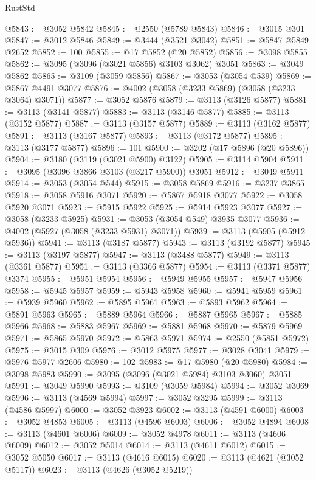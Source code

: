 \begin{lexlean}{RustStd}
\begin{coremodule}
@5843 := @3052 @5842
@5845 := @2550 (@5789 @5843)
@5846 := @3015 @301
@5847 := @3012 @5846
@5849 := @3444 (@3521 @3042)
@5851 := @5847 @5849 @2652
@5852 := 100
@5855 := @17 @5852 (@20 @5852)
@5856 := @3098 @5855
@5862 := @3095 (@3096 (@3021 @5856) @3103 @3062) @3051
@5863 := @3049 @5862
@5865 := @3109 (@3059 @5856)
@5867 := @3053 (@3054 @539)
@5869 := @5867 @4491 @3077
@5876 := @4002 (@3058 (@3233 @5869) (@3058 (@3233 @3064) @3071))
@5877 := @3052 @5876
@5879 := @3113 (@3126 @5877)
@5881 := @3113 (@3141 @5877)
@5883 := @3113 (@3146 @5877)
@5885 := @3113 (@3152 @5877)
@5887 := @3113 (@3157 @5877)
@5889 := @3113 (@3162 @5877)
@5891 := @3113 (@3167 @5877)
@5893 := @3113 (@3172 @5877)
@5895 := @3113 (@3177 @5877)
@5896 := 101
@5900 := @3202 (@17 @5896 (@20 @5896))
@5904 := @3180 (@3119 (@3021 @5900) @3122)
@5905 := @3114 @5904
@5911 := @3095 (@3096 @3866 @3103 (@3217 @5900)) @3051
@5912 := @3049 @5911
@5914 := @3053 (@3054 @544)
@5915 := @3058 @5869
@5916 := @3237 @3865
@5918 := @3058 @5916 @3071
@5920 := @5867 @5918 @3077
@5922 := @3058 @5920 @3071
@5923 := @5915 @5922
@5925 := @5914 @5923 @3077
@5927 := @3058 (@3233 @5925)
@5931 := @3053 (@3054 @549) @3935 @3077
@5936 := @4002 (@5927 (@3058 (@3233 @5931) @3071))
@5939 := @3113 (@5905 (@5912 @5936))
@5941 := @3113 (@3187 @5877)
@5943 := @3113 (@3192 @5877)
@5945 := @3113 (@3197 @5877)
@5947 := @3113 (@3488 @5877)
@5949 := @3113 (@3361 @5877)
@5951 := @3113 (@3366 @5877)
@5954 := @3113 (@3371 @5877) @3374
@5955 := @5951 @5954
@5956 := @5949 @5955
@5957 := @5947 @5956
@5958 := @5945 @5957
@5959 := @5943 @5958
@5960 := @5941 @5959
@5961 := @5939 @5960
@5962 := @5895 @5961
@5963 := @5893 @5962
@5964 := @5891 @5963
@5965 := @5889 @5964
@5966 := @5887 @5965
@5967 := @5885 @5966
@5968 := @5883 @5967
@5969 := @5881 @5968
@5970 := @5879 @5969
@5971 := @5865 @5970
@5972 := @5863 @5971
@5974 := @2550 (@5851 @5972)
@5975 := @3015 @309
@5976 := @3012 @5975
@5977 := @3028 @3041
@5979 := @5976 @5977 @2606
@5980 := 102
@5983 := @17 @5980 (@20 @5980)
@5984 := @3098 @5983
@5990 := @3095 (@3096 (@3021 @5984) @3103 @3060) @3051
@5991 := @3049 @5990
@5993 := @3109 (@3059 @5984)
@5994 := @3052 @3069
@5996 := @3113 (@4569 @5994)
@5997 := @3052 @3295
@5999 := @3113 (@4586 @5997)
@6000 := @3052 @3923
@6002 := @3113 (@4591 @6000)
@6003 := @3052 @4853
@6005 := @3113 (@4596 @6003)
@6006 := @3052 @4894
@6008 := @3113 (@4601 @6006)
@6009 := @3052 @4978
@6011 := @3113 (@4606 @6009)
@6012 := @3052 @5014
@6014 := @3113 (@4611 @6012)
@6015 := @3052 @5050
@6017 := @3113 (@4616 @6015)
@6020 := @3113 (@4621 (@3052 @5117))
@6023 := @3113 (@4626 (@3052 @5219))

\end{coremodule}
\end{lexlean}
